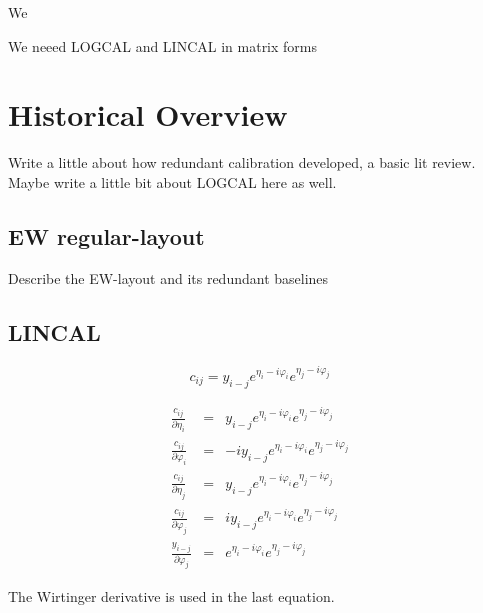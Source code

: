 \documentclass[a4paper,fleqn,usenatbib]{mnras}
\begin{document}
\begin{enumerate}
 We
 
 We neeed LOGCAL and LINCAL in matrix forms
 
 
 
\end{enumerate} 


\section{Historical Overview}

Write a little about how redundant calibration developed, a basic lit review.
Maybe write a little bit about LOGCAL here as well.

\subsection{EW regular-layout}
Describe the EW-layout and its redundant baselines

\subsection{LINCAL}
\begin{equation}
c_{ij} = y_{i-j} e^{\eta_i - i \varphi_i} e^{\eta_j - i \varphi_j}
\end{equation}

\begin{eqnarray}
\frac{c_{ij}}{\partial \eta_i} &=& y_{i-j} e^{\eta_i - i \varphi_i} e^{\eta_j - i \varphi_j}\\ 
\frac{c_{ij}}{\partial \varphi_i} &=&  -i y_{i-j} e^{\eta_i - i \varphi_i} e^{\eta_j - i \varphi_j}\\
\frac{c_{ij}}{\partial \eta_j} &=& y_{i-j} e^{\eta_i - i \varphi_i} e^{\eta_j - i \varphi_j}\\ 
\frac{c_{ij}}{\partial \varphi_j} &=&  i y_{i-j} e^{\eta_i - i \varphi_i} e^{\eta_j - i \varphi_j}\\
\frac{y_{i-j}}{\partial \varphi_j} &=&  e^{\eta_i - i \varphi_i} e^{\eta_j - i \varphi_j}
\end{eqnarray}

The Wirtinger derivative is used in the last equation.
\end{document}
